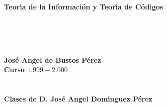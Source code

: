 \documentclass[a4paper,openright,12pt]{report}
\begin{document}
\ \\ \\
\Huge

\begin{flushright}
\textbf{Teor\'{\i}a de la Informaci\'on y Teor\'{\i}a de C\'odigos}
\end{flushright}
\ \\ \\

\begin{flushright}
\Large
\ \\
\textbf{Jos\'e Angel de Bustos P\'erez}\\
\textbf{Curso $1.999-2.000$}\\ \ \\ \ \\
\textbf{Clases de D. Jos\'e Angel Dom\'{\i}nguez P\'erez}
\end{flushright}

\normalsize

\thispagestyle{empty}

\tableofcontents
\listoffigures
\listoftables

%
%



%
%



%
% 



%
%



%
%



%
%



%
%



%
%


\end{document}
